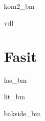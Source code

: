 \newpage
{kom2_bm}

{vdl}

\newpage
{}
{}
\chapter*{Fasit}
{fas_bm}

{lit_bm}
{\printindex {}
	}
{bakside_bm}









